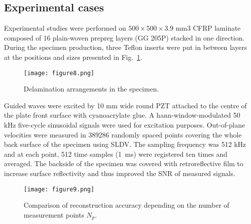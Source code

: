 \subsection{Experimental cases}

Experimental studies were performed on $500 \times 500\times 3.9$ mm3 CFRP laminate composed of 16 plain-woven prepreg layers (GG 205P) stacked in one direction. 
During the specimen production, three Teflon inserts were put in between layers at the positions and sizes presented in Fig.~\ref{fig:specimen}.

\begin{figure} [!ht]
	\centering
	\texttt{[image: figure8.png]}
	\caption{Delamination arrangements in the specimen.}
	\label{fig:specimen}
\end{figure}

Guided waves were excited by 10 mm wide round PZT attached to the centre of the plate front surface with cyanoacrylate glue. 
A hann-window-modulated 50 kHz five-cycle sinusoidal signals were used for excitation purposes.
Out-of-plane velocities were measured in 389286 randomly spaced points covering the whole back surface of the specimen using SLDV. 
The sampling frequency was 512 kHz and at each point, 512 time samples (1 ms) were registered ten times and averaged.
The backside of the specimen was covered with retroreflective film to increase surface reflectivity and thus improved the SNR of measured signals.

\begin{figure} [!ht]
	\centering
	\texttt{[image: figure9.png]}
	\caption{Comparison of reconstruction accuracy depending on the number of measurement points $N_p$.}
	\label{fig:points_metrics}
\end{figure}

